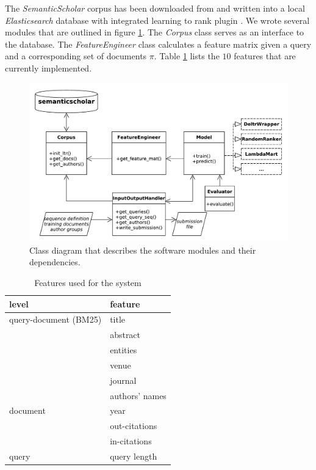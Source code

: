 \documentclass[sigconf, nonacm]{acmart}
\begin{document}
The \emph{SemanticScholar} corpus has been downloaded from \cite{ammar_18} and written into a local \emph{Elasticsearch} database with integrated learning to rank plugin \cite{noauthor_o19s/elasticsearch-learning--rank_2019}. We wrote several modules that are outlined in figure \ref{fig:model}. The \emph{Corpus} class serves as an interface to the database. The \emph{FeatureEngineer} class calculates a feature matrix given a query and a corresponding set of documents $\pi$. Table \ref{tab:features} lists the $10$ features that are currently implemented. 

\begin{figure}[t]
    \centering
    \includegraphics[width=\columnwidth]{model.pdf}
    \caption{Class diagram that describes the software modules and their dependencies.}
    \label{fig:model}
\end{figure}

\begin{table}[t]
    \centering
    \begin{tabular}{ll}
    \toprule
    level & feature \\
    \midrule
    query-document (BM25) &  title\\
    & abstract \\
    & entities \\
    & venue \\
    & journal \\
    & authors' names \\
    \midrule
    document &  year\\
    & out-citations \\
    & in-citations \\
    \midrule
    query & query length \\
    \bottomrule
    \end{tabular}
    \caption{Features used for the system}
    \label{tab:features}
\end{table}
\end{document}
